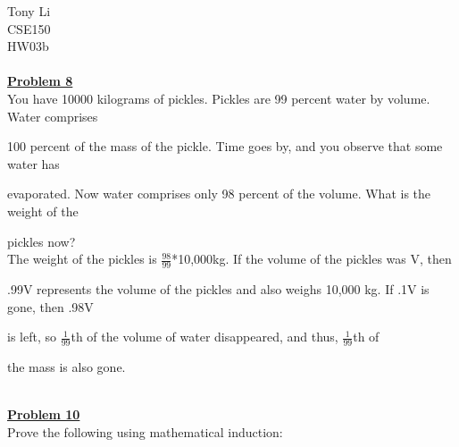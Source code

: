 \documentclass[11pt]{article}
\begin{document}
\noindent 
Tony Li \\
CSE150 \\
HW03b \\\\

\noindent\textbf{\underline{Problem 8}}\\
	
	You have 10000 kilograms of pickles. Pickles are 99 percent water by volume. Water comprises 

	100 percent of the mass of the pickle. Time goes by, and you observe that some water has 

	evaporated. Now water comprises only 98 percent of the volume. What is the weight of the 

	pickles now?\\

	The weight of the pickles is $\frac{98}{99}$*10,000kg. If the volume of the pickles was V, then 

	.99V represents the volume of the pickles and also weighs 10,000 kg. If .1V is gone, then .98V

	is left, so $\frac{1}{99}$th of the volume of water disappeared, and thus, $\frac{1}{99}$th of 

	the mass is also gone. 

\	\\
\noindent\textbf{\underline{Problem 10}}\\
	
	Prove the following using mathematical induction: 
\end{document}
